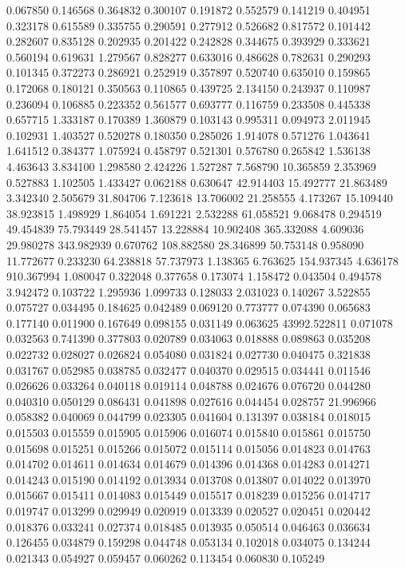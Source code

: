0.067850
0.146568
0.364832
0.300107
0.191872
0.552579
0.141219
0.404951
0.323178
0.615589
0.335755
0.290591
0.277912
0.526682
0.817572
0.101442
0.282607
0.835128
0.202935
0.201422
0.242828
0.344675
0.393929
0.333621
0.560194
0.619631
1.279567
0.828277
0.633016
0.486628
0.782631
0.290293
0.101345
0.372273
0.286921
0.252919
0.357897
0.520740
0.635010
0.159865
0.172068
0.180121
0.350563
0.110865
0.439725
2.134150
0.243937
0.110987
0.236094
0.106885
0.223352
0.561577
0.693777
0.116759
0.233508
0.445338
0.657715
1.333187
0.170389
1.360879
0.103143
0.995311
0.094973
2.011945
0.102931
1.403527
0.520278
0.180350
0.285026
1.914078
0.571276
1.043641
1.641512
0.384377
1.075924
0.458797
0.521301
0.576780
0.265842
1.536138
4.463643
3.834100
1.298580
2.424226
1.527287
7.568790
10.365859
2.353969
0.527883
1.102505
1.433427
0.062188
0.630647
42.914403
15.492777
21.863489
3.342340
2.505679
31.804706
7.123618
13.706002
21.258555
4.173267
15.109440
38.923815
1.498929
1.864054
1.691221
2.532288
61.058521
9.068478
0.294519
49.454839
75.793449
28.541457
13.228884
10.902408
365.332088
4.609036
29.980278
343.982939
0.670762
108.882580
28.346899
50.753148
0.958090
11.772677
0.233230
64.238818
57.737973
1.138365
6.763625
154.937345
4.636178
910.367994
1.080047
0.322048
0.377658
0.173074
1.158472
0.043504
0.494578
3.942472
0.103722
1.295936
1.099733
0.128033
2.031023
0.140267
3.522855
0.075727
0.034495
0.184625
0.042489
0.069120
0.773777
0.074390
0.065683
0.177140
0.011900
0.167649
0.098155
0.031149
0.063625
43992.522811
0.071078
0.032563
0.741390
0.377803
0.020789
0.034063
0.018888
0.089863
0.035208
0.022732
0.028027
0.026824
0.054080
0.031824
0.027730
0.040475
0.321838
0.031767
0.052985
0.038785
0.032477
0.040370
0.029515
0.034441
0.011546
0.026626
0.033264
0.040118
0.019114
0.048788
0.024676
0.076720
0.044280
0.040310
0.050129
0.086431
0.041898
0.027616
0.044454
0.028757
21.996966
0.058382
0.040069
0.044799
0.023305
0.041604
0.131397
0.038184
0.018015
0.015503
0.015559
0.015905
0.015906
0.016074
0.015840
0.015861
0.015750
0.015698
0.015251
0.015266
0.015072
0.015114
0.015056
0.014823
0.014763
0.014702
0.014611
0.014634
0.014679
0.014396
0.014368
0.014283
0.014271
0.014243
0.015190
0.014192
0.013934
0.013708
0.013807
0.014022
0.013970
0.015667
0.015411
0.014083
0.015449
0.015517
0.018239
0.015256
0.014717
0.019747
0.013299
0.029949
0.020919
0.013339
0.020527
0.020451
0.020442
0.018376
0.033241
0.027374
0.018485
0.013935
0.050514
0.046463
0.036634
0.126455
0.034879
0.159298
0.044748
0.053134
0.102018
0.034075
0.134244
0.021343
0.054927
0.059457
0.060262
0.113454
0.060830
0.105249
